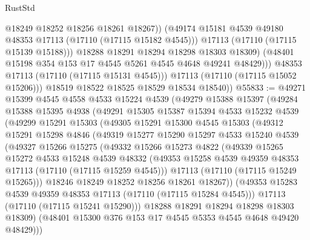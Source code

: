 \begin{lexlean}{RustStd}
\begin{coremodule}
                        @18249
                        @18252
                        @18256
                        @18261
                        @18267))
                    (@49174 @15181 @4539 @49180 @48353 @17113 (@17110 (@17115 @15182 @4545)))
                    @17113
                    (@17110 (@17115 @15139 @15188)))
                  @18288
                  @18291
                  @18294
                  @18298
                  @18303
                  @18309)
                (@48401 @15198 @354 @153 @17 @4545 @5261 @4545 @4648 @49241 @48429)))
            @48353
            @17113
            (@17110 (@17115 @15131 @4545)))
          @17113
          (@17110 (@17115 @15052 @15206)))
        @18519
        @18522
        @18525
        @18529
        @18534
        @18540))
@55833 := @49271
    @15399
    @4545
    @4558
    @4533
    @15224
    @4539
    (@49279
      @15388
      @15397
      (@49284
        @15388
        @15395
        @4938
        (@49291
          @15305
          @15387
          @15394
          @4533
          @15232
          @4539
          (@49299
            @15291
            @15303
            (@49305
              @15291
              @15300
              @4545
              @15303
              (@49312
                @15291
                @15298
                @4846
                (@49319
                  @15277
                  @15290
                  @15297
                  @4533
                  @15240
                  @4539
                  (@49327
                    @15266
                    @15275
                    (@49332
                      @15266
                      @15273
                      @4822
                      (@49339
                        @15265
                        @15272
                        @4533
                        @15248
                        @4539
                        @48332
                        (@49353 @15258 @4539 @49359 @48353 @17113 (@17110 (@17115 @15259 @4545)))
                        @17113
                        (@17110 (@17115 @15249 @15265)))
                      @18246
                      @18249
                      @18252
                      @18256
                      @18261
                      @18267))
                  (@49353 @15283 @4539 @49359 @48353 @17113 (@17110 (@17115 @15284 @4545)))
                  @17113
                  (@17110 (@17115 @15241 @15290)))
                @18288
                @18291
                @18294
                @18298
                @18303
                @18309)
              (@48401 @15300 @376 @153 @17 @4545 @5353 @4545 @4648 @49420 @48429)))

\end{coremodule}
\end{lexlean}
